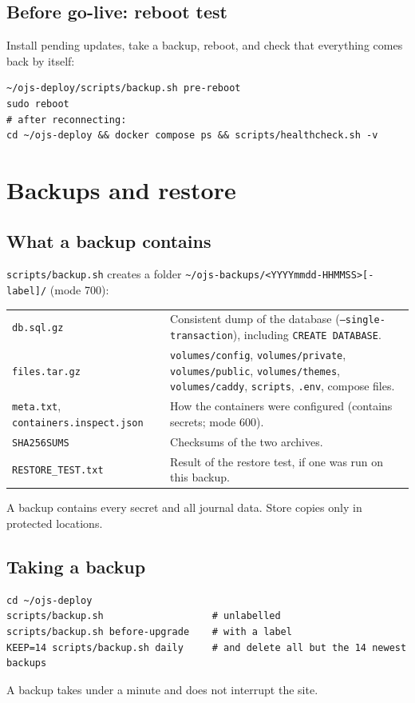 \documentclass[11pt,a4paper]{report}
\newcommand{\code}[1]{\texttt{\small #1}}
\newcommand{\file}[1]{\texttt{\small #1}}
\begin{document}
\section{Before go-live: reboot test}
Install pending updates, take a backup, reboot, and check that everything comes back by itself:
\begin{lstlisting}
~/ojs-deploy/scripts/backup.sh pre-reboot
sudo reboot
# after reconnecting:
cd ~/ojs-deploy && docker compose ps && scripts/healthcheck.sh -v
\end{lstlisting}

\chapter{Backups and restore}\label{ch:backup}

\section{What a backup contains}
\file{scripts/backup.sh} creates a folder \file{\textasciitilde/ojs-backups/<YYYYmmdd-HHMMSS>[-label]/} (mode 700):
\begin{tabularx}{\linewidth}{@{}P{4.6cm}L@{}}
\toprule
\file{db.sql.gz}      & Consistent dump of the database (\code{--single-transaction}), including \code{CREATE DATABASE}. \\
\file{files.tar.gz}   & \file{volumes/config}, \file{volumes/private}, \file{volumes/public}, \file{volumes/themes}, \file{volumes/caddy}, \file{scripts}, \file{.env}, compose files. \\
\file{meta.txt}, \file{containers.inspect.json} & How the containers were configured (contains secrets; mode 600). \\
\file{SHA256SUMS}     & Checksums of the two archives. \\
\file{RESTORE\_TEST.txt} & Result of the restore test, if one was run on this backup. \\
\bottomrule
\end{tabularx}
\begin{warning}
A backup contains every secret and all journal data. Store copies only in protected locations.
\end{warning}

\section{Taking a backup}
\begin{lstlisting}
cd ~/ojs-deploy
scripts/backup.sh                   # unlabelled
scripts/backup.sh before-upgrade    # with a label
KEEP=14 scripts/backup.sh daily     # and delete all but the 14 newest backups
\end{lstlisting}
A backup takes under a minute and does not interrupt the site.
\end{document}
